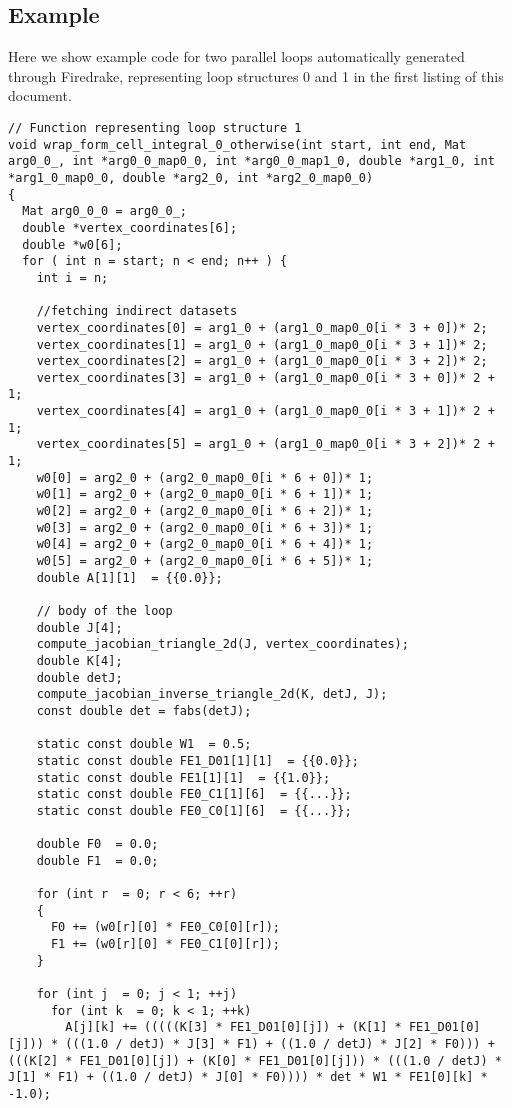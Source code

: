 \documentclass[a4paper]{article}
\begin{document}
\begin{appendices}
\section{Example}
Here we show example code for two parallel loops automatically generated through Firedrake, representing loop structures 0 and 1 in the first listing of this document.

\scriptsize
\begin{lstlisting}
// Function representing loop structure 1
void wrap_form_cell_integral_0_otherwise(int start, int end, Mat arg0_0_, int *arg0_0_map0_0, int *arg0_0_map1_0, double *arg1_0, int *arg1_0_map0_0, double *arg2_0, int *arg2_0_map0_0) 
{
  Mat arg0_0_0 = arg0_0_;
  double *vertex_coordinates[6];
  double *w0[6];
  for ( int n = start; n < end; n++ ) {
    int i = n;
    
    //fetching indirect datasets
    vertex_coordinates[0] = arg1_0 + (arg1_0_map0_0[i * 3 + 0])* 2;
    vertex_coordinates[1] = arg1_0 + (arg1_0_map0_0[i * 3 + 1])* 2;
    vertex_coordinates[2] = arg1_0 + (arg1_0_map0_0[i * 3 + 2])* 2;
    vertex_coordinates[3] = arg1_0 + (arg1_0_map0_0[i * 3 + 0])* 2 + 1;
    vertex_coordinates[4] = arg1_0 + (arg1_0_map0_0[i * 3 + 1])* 2 + 1;
    vertex_coordinates[5] = arg1_0 + (arg1_0_map0_0[i * 3 + 2])* 2 + 1;
    w0[0] = arg2_0 + (arg2_0_map0_0[i * 6 + 0])* 1;
    w0[1] = arg2_0 + (arg2_0_map0_0[i * 6 + 1])* 1;
    w0[2] = arg2_0 + (arg2_0_map0_0[i * 6 + 2])* 1;
    w0[3] = arg2_0 + (arg2_0_map0_0[i * 6 + 3])* 1;
    w0[4] = arg2_0 + (arg2_0_map0_0[i * 6 + 4])* 1;
    w0[5] = arg2_0 + (arg2_0_map0_0[i * 6 + 5])* 1;
    double A[1][1]  = {{0.0}};

    // body of the loop
    double J[4];
    compute_jacobian_triangle_2d(J, vertex_coordinates);
    double K[4];
    double detJ;
    compute_jacobian_inverse_triangle_2d(K, detJ, J);  
    const double det = fabs(detJ);

    static const double W1  = 0.5;  
    static const double FE1_D01[1][1]  = {{0.0}};  
    static const double FE1[1][1]  = {{1.0}};  
    static const double FE0_C1[1][6]  = {{...}};  
    static const double FE0_C0[1][6]  = {{...}};

    double F0  = 0.0;
    double F1  = 0.0;

    for (int r  = 0; r < 6; ++r)
    {
      F0 += (w0[r][0] * FE0_C0[0][r]);
      F1 += (w0[r][0] * FE0_C1[0][r]);  
    }

    for (int j  = 0; j < 1; ++j)
      for (int k  = 0; k < 1; ++k)
        A[j][k] += (((((K[3] * FE1_D01[0][j]) + (K[1] * FE1_D01[0][j])) * (((1.0 / detJ) * J[3] * F1) + ((1.0 / detJ) * J[2] * F0))) + (((K[2] * FE1_D01[0][j]) + (K[0] * FE1_D01[0][j])) * (((1.0 / detJ) * J[1] * F1) + ((1.0 / detJ) * J[0] * F0)))) * det * W1 * FE1[0][k] * -1.0);      
   

\end{lstlisting}
\end{appendices}
\end{document}
